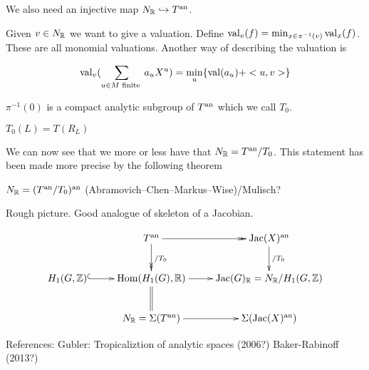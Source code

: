 \noindent We also need an injective map $N_{\mathbb{R}}\hookrightarrow T^{\mathrm{an}}$. 

Given $v\in N_{\mathbb{R}}$ we want to give a valuation. Define $\mathrm{val}_v(f) = \min_{x\in \pi^{-1}(v)}\mathrm{val}_x(f)$.
\noindent These are all monomial valuations. Another way of describing the valuation is 

\[\mathrm{val}_v(\sum_{u\in M \text{ finite }}a_{u}X^u) = \min_u\{\mathrm{val}(a_u)+<u,v>\}\]

$\pi^{-1}(0)$ is a compact analytic subgroup of $T^{\mathrm{an}}$ which we call $T_0$. 

$T_0(L) = T(R_L)$

\noindent We can now see that we more or less have that $N_{\mathbb{R}} = T^{\mathrm{an}}/T_0$. This statement has been made more precise by the following theorem

\begin{theorem} $N_{\mathbb{R}} = (T^{\mathrm{an}}/T_0)^{\mathrm{an}}$ (Abramovich--Chen--Markus--Wise)/Mulisch?

\noindent Rough picture. Good analogue of skeleton of a Jacobian.

\end{theorem}
 
\[
\xymatrix{
 & T^{\an} \ar@{->>}[r] \ar@{->>}[d]^{/T_0} & \Jac(X)^{\an} \ar[d]^{/T_0} \\
H_1(G,\ZZ) \ar@{^{(}->}[r] & \Hom(H_1(G),\RR) \ar[r] \ar@{=}[d] & \Jac(G)_{\RR} = N_{\RR}/H_1(G,\ZZ) \\
 & N_{\RR} = \Sigma(T^{\an}) \ar[r] & \Sigma(\Jac(X)^{\an}) 
 }
\]

References: 
Gubler: Tropicaliztion of analytic spaces (2006?)
Baker-Rabinoff (2013?)
